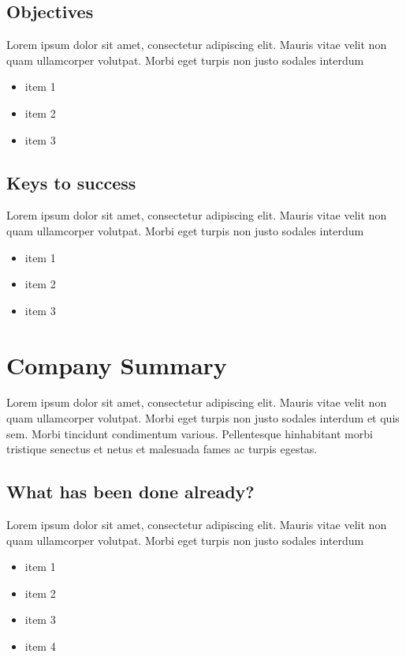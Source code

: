 \documentclass[11pt]{article}
\begin{document}
\subsection{Objectives}
Lorem ipsum dolor sit amet, consectetur adipiscing elit. Mauris vitae velit
non quam ullamcorper volutpat. Morbi eget turpis non justo sodales interdum
\newline
\begin{itemize}
\item item 1
\item item 2
\item item 3
\end{itemize}

\subsection{Keys to success}
Lorem ipsum dolor sit amet, consectetur adipiscing elit. Mauris vitae velit
non quam ullamcorper volutpat. Morbi eget turpis non justo sodales interdum
\newline
\begin{itemize}
\item item 1
\item item 2
\item item 3
\end{itemize}

\section{Company Summary}
Lorem ipsum dolor sit amet, consectetur adipiscing elit. Mauris vitae velit
non quam ullamcorper volutpat. Morbi eget turpis non justo sodales interdum
et quis sem. Morbi tincidunt condimentum various. Pellentesque hinhabitant morbi
tristique senectus et netus et malesuada fames ac turpis egestas.\newline

\subsection{What has been done already?}
Lorem ipsum dolor sit amet, consectetur adipiscing elit. Mauris vitae velit
non quam ullamcorper volutpat. Morbi eget turpis non justo sodales interdum
\newline
\begin{itemize}
\item item 1
\item item 2
\item item 3
\item item 4
\end{itemize}
\end{document}

